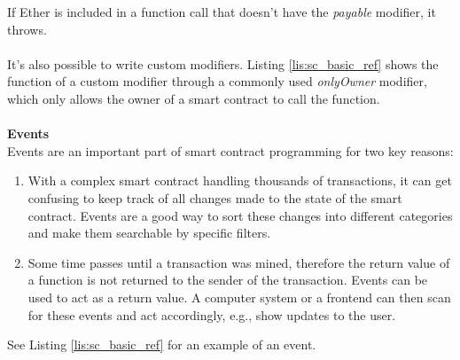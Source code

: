 If Ether is included in a function call that doesn't have the \textit{payable} modifier, it throws.
\\\\
It's also possible to write custom modifiers.
Listing \ref{lis:sc_basic_ref} shows the function of a custom modifier through a commonly used \textit{onlyOwner} modifier, which only allows the owner of a smart contract to call the function.
\\\\
\textbf{Events}\\
Events are an important part of smart contract programming for two key reasons:
\begin{enumerate}
  \item With a complex smart contract handling thousands of transactions, it can get confusing to keep track of all changes made to the state of the smart contract.
  Events are a good way to sort these changes into different categories and make them searchable by specific filters.
  \item Some time passes until a transaction was mined, therefore the return value of a function is not returned to the sender of the transaction.
  Events can be used to act as a return value.
  A computer system or a frontend can then scan for these events and act accordingly, e.g., show updates to the user.
\end{enumerate}
See Listing \ref{lis:sc_basic_ref} for an example of an event.
\\\\
